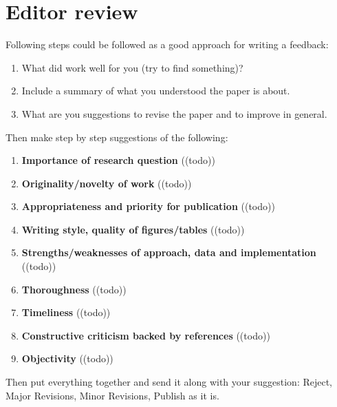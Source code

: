 \section{Editor review}\label{sec:editorreview}
Following steps could be followed as a good approach for writing a feedback:
\begin{enumerate}[resume]
    \item What did work well for you (try to find something)?
    \item Include a summary of what you understood the paper is about.
    \item What are you suggestions to revise the paper and to improve in general.
 \end{enumerate}
 Then make step by step suggestions of the following:
 \begin{enumerate}[resume]
    \item \textbf{Importance of research question} 	\textcolor{HighlightColor}{((todo))}
    \item \textbf{Originality/novelty of work} 	\textcolor{HighlightColor}{((todo))}
    \item \textbf{Appropriateness and priority for publication} 	\textcolor{HighlightColor}{((todo))}
    \item \textbf{Writing style, quality of figures/tables} 	\textcolor{HighlightColor}{((todo))}
    \item \textbf{Strengths/weaknesses of approach, data and implementation} 	\textcolor{HighlightColor}{((todo))}
    \item \textbf{Thoroughness} 	\textcolor{HighlightColor}{((todo))}
    \item \textbf{Timeliness} 	\textcolor{HighlightColor}{((todo))}
    \item \textbf{Constructive criticism backed by references} \textcolor{HighlightColor}{((todo))}
    \item \textbf{Objectivity} 	\textcolor{HighlightColor}{((todo))}
\end{enumerate}
Then put everything together and send it along with your suggestion: Reject, Major Revisions, Minor Revisions, Publish as it is.
